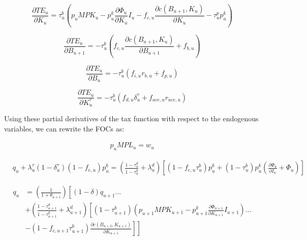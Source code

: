 \begin{equation}
\label{eqn:d_te_k}
\frac{\partial TE_{u}}{\partial K_{u}}= \tau^{b}_{u}\left( p_{u}MPK_{u} - p^{k}_{u}\frac{\partial \Phi_{u}}{\partial K_{u}}I_{u} - f_{c,u}\frac{\partial c(B_{u+1},K_{u})}{\partial K_{u}}- \tau^{p}_{u}p^{k}_{u}\right)
\end{equation}

\begin{equation}
\label{eqn:d_te_bp1}
\frac{\partial TE_{u}}{\partial B_{u+1}}= -\tau^{b}_{u}\left( f_{c,u}\frac{\partial c(B_{u+1},K_{u})}{\partial B_{u+1}} + f_{b,u}\right)
\end{equation}

\begin{equation}
\label{eqn:d_te_b}
\frac{\partial TE_{u}}{\partial B_{u}}= -\tau^{b}_{u}\left(f_{i,u}r_{b,u} + f_{p,u} \right)
\end{equation}

\begin{equation}
\label{eqn:d_te_b}
\frac{\partial TE_{u}}{\partial K^{\tau}_{u}}= -\tau^{b}_{u}\left(f_{d,u}\delta^{\tau}_{u}+f_{ace,u}r_{ace,u} \right)
\end{equation}


Using these partial derivatives of the tax function with respect to the endogenous variables, we can rewrite the FOCs as:


\begin{equation}
\label{eqn:foc_l_tax}
\begin{split}
 p_{u}MPL_{u} = w_{u} 
 \end{split}
\end{equation}

 \begin{equation}
\label{eqn:foc_i_tax}
\begin{split}
 & q_{u} + \lambda^{\tau}_{u}(1-\delta^{\tau}_{u})(1-f_{e,u})p^{k}_{u} =  \left(\frac{1-\tau^{d}_{u}}{1-\tau^{g}_{u}} + \lambda^{d}_{u}\right)\left[(1-f_{e,u}\tau^{b}_{u})p^{k}_{u}+ (1-\tau^{b}_{u})p^{k}_{u}\left(\frac{\partial \Phi_{u}}{\partial I_{u}} + \Phi_{u}\right)\right]
\end{split}
\end{equation}


 \begin{equation}
\label{eqn:foc_k_tax}
\begin{split}
 q_{u} & = \left(\frac{1}{1+\theta_{u+1}}\right)\left[(1-\delta)q_{u+1} ... \right. \\
& \left. +  \left(\frac{1-\tau^{d}_{u+1}}{1-\tau^{g}_{u+1}} + \lambda^{d}_{u+1} \right)\left[(1-\tau^{b}_{u+1})\left(p_{u+1}MPK_{u+1}- p^{k}_{u+1}\frac{\partial \Phi_{u+1}}{\partial K_{u+1}}I_{u+1}\right)  ... \right.\right. \\
& \left.\left.-(1-f_{c,u+1}\tau^{b}_{u+1}) \frac{\partial c(B_{u+2},K_{u+1})}{\partial K_{u+1}} \right] \right]
\end{split}
\end{equation}

